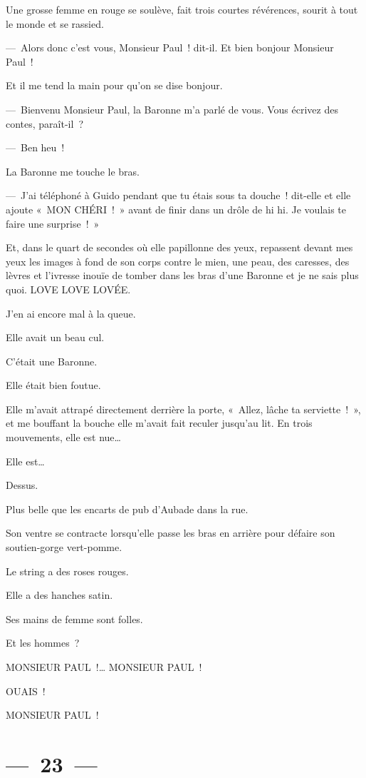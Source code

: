 \documentclass[french,twoside]{book} %
\begin{document}
Une grosse femme en rouge se soulève, fait trois courtes révérences, sourit à tout le monde et se rassied.\par
— Alors donc c’est vous, Monsieur Paul ! dit-il. Et bien bonjour Monsieur Paul !\par
Et il me tend la main pour qu’on se dise bonjour.\par
— Bienvenu Monsieur Paul, la Baronne m’a parlé de vous. Vous écrivez des contes, paraît-il ?\par
— Ben heu !\par
La Baronne me touche le bras.\par
— J’ai téléphoné à Guido pendant que tu étais sous ta douche ! dit-elle et elle ajoute « MON CHÉRI ! » avant de finir dans un drôle de hi hi. Je voulais te faire une surprise ! »\par
Et, dans le quart de secondes où elle papillonne des yeux, repassent devant mes yeux les images à fond de son corps contre le mien, une peau, des caresses, des lèvres et l’ivresse inouïe de tomber dans les bras d’une Baronne et je ne sais plus quoi. LOVE LOVE LOVÉE.\par
J’en ai encore mal à la queue.\par
Elle avait un beau cul.\par
C’était une Baronne.\par
Elle était bien foutue.\par
Elle m’avait attrapé directement derrière la porte, « Allez, lâche ta serviette ! », et me bouffant la bouche elle m’avait fait reculer jusqu’au lit. En trois mouvements, elle est nue…\par
Elle est…\par
Dessus.\par
Plus belle que les encarts de pub d’Aubade dans la rue.\par
Son ventre se contracte lorsqu’elle passe les bras en arrière pour défaire son soutien-gorge vert-pomme.\par
Le string a des roses rouges.\par
Elle a des hanches satin.\par
Ses mains de femme sont folles.\par
Et les hommes ?\par
MONSIEUR PAUL !… MONSIEUR PAUL !\par
OUAIS !\par
MONSIEUR PAUL !

\section[{— 23 —}]{— 23 —}
\renewcommand{\leftmark}{— 23 —}
\end{document}
